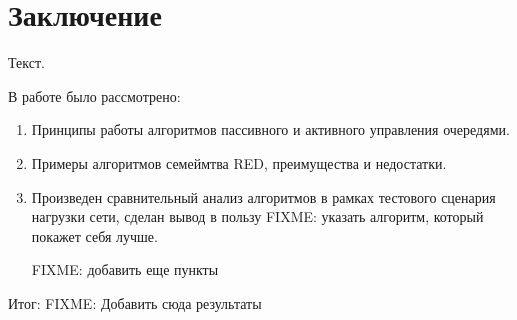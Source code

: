 \chapter*{Заключение}

Текст.

В работе было рассмотрено:
\begin{enumerate}

\item Принципы работы алгоритмов пассивного и активного управления очередями.

\item Примеры алгоритмов семеймтва RED, преимущества и недостатки.

\item Произведен сравнительный анализ алгоритмов в рамках тестового сценария нагрузки сети, сделан вывод в пользу FIXME: указать алгоритм, который покажет себя лучше. 

FIXME: добавить еще пункты

\end{enumerate}

Итог: FIXME: Добавить сюда результаты 


\clearpage



